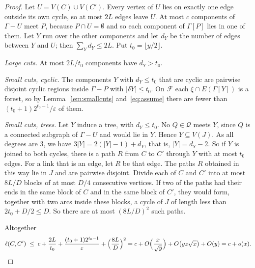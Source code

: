 \documentclass[11pt]{article}
\theoremstyle{definition}
\theoremstyle{remark}
\numberwithin{equation}{section}
\begin{document}
\begin{proof}
Let $U=V(C)\cup V(C')$. Every vertex of $U$ lies on exactly one edge outside its own cycle, so at
most $2L$ edges leave $U$. At most $c$ components of $\Gamma-U$ meet $P$, because $P\cap U=\emptyset$
and so each component of $\Gamma[P]$ lies in one of them. Let $Y$ run over the other components and
let $d_Y$ be the number of edges between $Y$ and $U$; then $\sum_Yd_Y\le2L$. Put
$t_0=\lfloor y/2\rfloor$.

\emph{Large cuts.} At most $2L/t_0$ components have $d_Y>t_0$.

\emph{Small cuts, cyclic.} The components $Y$ with $d_Y\le t_0$ that are cyclic are pairwise
disjoint cyclic regions inside $\Gamma-P$ with $|\delta Y|\le t_0$. On $\mathcal{F}$ each
$\xi\cap E(\Gamma[Y])$ is a forest, so by Lemma~\ref{lem:smallcuts} and~\eqref{eq:assume} there are
fewer than $(t_0+1)2^{t_0-1}/\varepsilon$ of them.

\emph{Small cuts, trees.} Let $Y$ induce a tree, with $d_Y\le t_0$. No $Q\in\mathcal{Q}$ meets $Y$,
since $Q$ is a connected subgraph of $\Gamma-U$ and would lie in $Y$. Hence $Y\subseteq V(J)$. As
all degrees are $3$, we have $3|Y|=2(|Y|-1)+d_Y$, that is, $|Y|=d_Y-2$. So if $Y$ is joined to both
cycles, there is a path $R$ from $C$ to $C'$ through $Y$ with at most $t_0$ edges. For a link that
is an edge, let $R$ be that edge. The paths $R$ obtained in this way lie in $J$ and are pairwise
disjoint. Divide each of $C$ and $C'$ into at most $8L/D$ blocks of at most $D/4$ consecutive
vertices. If two of the paths had their ends in the same block of $C$ and in the same block of $C'$,
they would form, together with two arcs inside these blocks, a cycle of $J$ of length less than
$2t_0+D/2\le D$. So there are at most $(8L/D)^{2}$ such paths.

Altogether
\[
  \ell(C,C')\;\le\;c+\frac{2L}{t_0}+\frac{(t_0+1)2^{t_0-1}}{\varepsilon}+\Bigl(\frac{8L}{D}\Bigr)^{2}
  =c+O\Bigl(\frac{x}{\sqrt y}\Bigr)+O\bigl(yz\sqrt x\bigr)+O(y)=c+o(x).\qedhere
\]
\end{proof}
\end{document}
